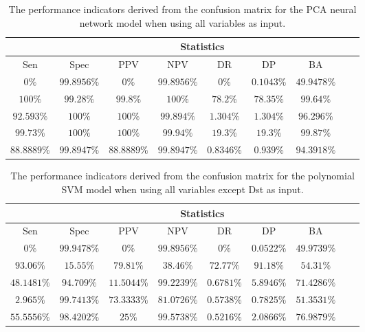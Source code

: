 \begin{table}[!ht]
	\centering
	\begin{tabular}{|c|c|c|c|c|c|c|c|c|}
		\hline
		 & \multicolumn{7}{c|}{Statistics} \\ \hline
		Sen & Spec & PPV & NPV & DR & DP & BA \\ \hline
		$0\%$ & $99.8956\%$ & $0\%$ & $99.8956\%$ & $0\%$ & $0.1043\%$ & $49.9478\%$ \\ \hline
		$100\%$ & $99.28\%$ & $99.8\%$ & $100\%$ & $78.2\%$ & $78.35\%$ & $99.64\%$ \\ \hline
		$92.593\%$ & $100\%$ & $100\%$ & $99.894\%$ & $1.304\%$ & $1.304\%$ & $96.296\%$ \\ \hline
		$99.73\%$ & $100\%$ & $100\%$ & $99.94\%$ & $19.3\%$ & $19.3\%$ & $99.87\%$ \\ \hline
		$88.8889\%$ & $99.8947\%$ & $88.8889\%$ & $99.8947\%$ & $0.8346\%$ & $0.939\%$ & $94.3918\%$ \\ \hline
	\end{tabular}
	\caption{The performance indicators derived from the confusion matrix for the PCA neural network model when using all variables as input.}
	\label{tab:cs:all:pcaNNet}
\end{table}

\begin{table}[!ht]
	\centering
	\begin{tabular}{|c|c|c|c|c|c|c|c|c|}
		\hline
		 & \multicolumn{7}{c|}{Statistics} \\ \hline
		Sen & Spec & PPV & NPV & DR & DP & BA \\ \hline
		$0\%$ & $99.9478\%$ & $0\%$ & $99.8956\%$ & $0\%$ & $0.0522\%$ & $49.9739\%$ \\ \hline
		$93.06\%$ & $15.55\%$ & $79.81\%$ & $38.46\%$ & $72.77\%$ & $91.18\%$ & $54.31\%$ \\ \hline
		$48.1481\%$ & $94.709\%$ & $11.5044\%$ & $99.2239\%$ & $0.6781\%$ & $5.8946\%$ & $71.4286\%$ \\ \hline
		$2.965\%$ & $99.7413\%$ & $73.3333\%$ & $81.0726\%$ & $0.5738\%$ & $0.7825\%$ & $51.3531\%$ \\ \hline
		$55.5556\%$ & $98.4202\%$ & $25\%$ & $99.5738\%$ & $0.5216\%$ & $2.0866\%$ & $76.9879\%$ \\ \hline
	\end{tabular}
	\caption{The performance indicators derived from the confusion matrix for the polynomial SVM model when using all variables except Dst as input.}
	\label{tab:cs:noDst:svmPoly}
\end{table}

